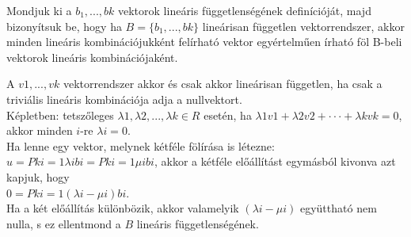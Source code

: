 \begin{frame}
  \begin{tcolorbox}[title={1. (4p)}]
    Mondjuk ki a $b_1,...,bk$ vektorok lineáris függetlenségének definícióját, majd bizonyítsuk be, hogy ha $B = \{b_1,...,bk\}$ lineárisan független vektorrendszer, akkor minden lineáris kombinációjukként felírható vektor egyértelműen írható föl B-beli vektorok lineáris kombinációjaként.
  \tcblower
  
    A $v1,...,vk$ vektorrendszer akkor és csak akkor lineárisan független, ha csak a triviális lineáris kombinációja adja a nullvektort.\\

    Képletben: tetszőleges ${\lambda}1,{\lambda}2,...,{\lambda}k \in R$ esetén, ha ${\lambda}1v1 + {\lambda}2v2 +  \cdot  \cdot  \cdot  + {\lambda}kvk = 0$, akkor minden $i$-re ${\lambda}i = 0$.\\

    Ha lenne egy vektor, melynek kétféle fölírása is létezne: $u = Pk i=1 {\lambda}ibi = Pk i=1 {\mu}ibi$, akkor a kétféle előállítást egymásból kivonva azt kapjuk, hogy\\

    $0 = Pk i=1({\lambda}i -{\mu}i)bi$.\\

    Ha a két előállítás különbözik, akkor valamelyik $({\lambda}i-{\mu}i)$ együttható nem nulla, s ez ellentmond a $B$ lineáris függetlenségének.
  \end{tcolorbox}
\end{frame}


